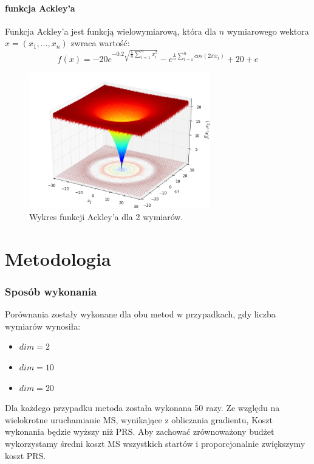 \documentclass{lab}
\begin{document}
\subsection{funkcja Ackley’a}
Funkcja Ackley'a jest funkcją wielowymiarową, która dla $n$ wymiarowego wektora $x = (x_1, ... , x_n)$ zwraca wartość:
\begin{equation*}
    f(x) = -20e^{-0.2\sqrt{\frac{1}{n}\sum_{i=1}^{n} x^2_i}} - e^{\frac{1}{n}\sum_{i=1}^{n}cos(2\pi x_i)} + 20 + e
\end{equation*}
\begin{figure}[H]
  \centering
  \includegraphics[width=0.7\textwidth]{img/Ackley.png}
  \caption{Wykres funkcji Ackley'a dla 2 wymiarów.}
\end{figure}

\newpage
\part{Metodologia}
\section{Sposób wykonania}
Porównania zostały wykonane dla obu metod w przypadkach, gdy liczba wymiarów wynosiła:
\begin{itemize}
    \item $dim = 2$
    \item $dim = 10$
    \item $dim = 20$
\end{itemize}
\par Dla każdego przypadku metoda została wykonana 50 razy. Ze względu na wielokrotne uruchamianie MS, wynikające z obliczania gradientu, Koszt wykonania będzie wyższy niż PRS. Aby zachować zrównoważony budżet wykorzystamy średni koszt MS wszystkich startów i proporcjonalnie zwiększymy koszt PRS.
\end{document}
